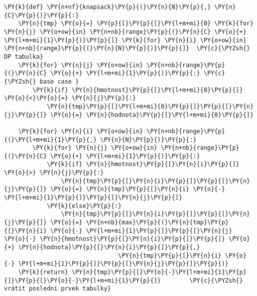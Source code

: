 \begin{Verbatim}[commandchars=\\\{\}]
\PY{k}{def} \PY{n+nf}{knapsack}\PY{p}{(}\PY{n}{N}\PY{p}{,} \PY{n}{C}\PY{p}{)}\PY{p}{:}
	\PY{n}{tmp} \PY{o}{=} \PY{p}{[}\PY{p}{[}\PY{l+m+mi}{0} \PY{k}{for} \PY{n}{j} \PY{o+ow}{in} \PY{n+nb}{range}\PY{p}{(}\PY{n}{C} \PY{o}{+} \PY{l+m+mi}{1}\PY{p}{)}\PY{p}{]} \PY{k}{for} \PY{n}{i} \PY{o+ow}{in} \PY{n+nb}{range}\PY{p}{(}\PY{n}{N}\PY{p}{)}\PY{p}{]}  \PY{c}{\PYZsh{} DP tabulka}
	\PY{k}{for} \PY{n}{j} \PY{o+ow}{in} \PY{n+nb}{range}\PY{p}{(}\PY{n}{C} \PY{o}{+} \PY{l+m+mi}{1}\PY{p}{)}\PY{p}{:} \PY{c}{\PYZsh{} base case }
		\PY{k}{if} \PY{n}{hmotnost}\PY{p}{[}\PY{l+m+mi}{0}\PY{p}{]} \PY{o}{<}\PY{o}{=} \PY{n}{j}\PY{p}{:}
			\PY{n}{tmp}\PY{p}{[}\PY{l+m+mi}{0}\PY{p}{]}\PY{p}{[}\PY{n}{j}\PY{p}{]} \PY{o}{=} \PY{n}{hodnota}\PY{p}{[}\PY{l+m+mi}{0}\PY{p}{]}

	\PY{k}{for} \PY{n}{i} \PY{o+ow}{in} \PY{n+nb}{range}\PY{p}{(}\PY{l+m+mi}{1}\PY{p}{,} \PY{n}{N}\PY{p}{)}\PY{p}{:}
		\PY{k}{for} \PY{n}{j} \PY{o+ow}{in} \PY{n+nb}{range}\PY{p}{(}\PY{n}{C} \PY{o}{+} \PY{l+m+mi}{1}\PY{p}{)}\PY{p}{:}
			\PY{k}{if} \PY{n}{hmotnost}\PY{p}{[}\PY{n}{i}\PY{p}{]} \PY{o}{>} \PY{n}{j}\PY{p}{:}
				\PY{n}{tmp}\PY{p}{[}\PY{n}{i}\PY{p}{]}\PY{p}{[}\PY{n}{j}\PY{p}{]} \PY{o}{=} \PY{n}{tmp}\PY{p}{[}\PY{n}{i} \PY{o}{-} \PY{l+m+mi}{1}\PY{p}{]}\PY{p}{[}\PY{n}{j}\PY{p}{]}
			\PY{k}{else}\PY{p}{:}
				\PY{n}{tmp}\PY{p}{[}\PY{n}{i}\PY{p}{]}\PY{p}{[}\PY{n}{j}\PY{p}{]} \PY{o}{=} \PY{n+nb}{max}\PY{p}{(}\PY{n}{tmp}\PY{p}{[}\PY{n}{i} \PY{o}{-} \PY{l+m+mi}{1}\PY{p}{]}\PY{p}{[}\PY{n}{j} \PY{o}{-} \PY{n}{hmotnost}\PY{p}{[}\PY{n}{i}\PY{p}{]}\PY{p}{]} \PY{o}{+} \PY{n}{hodnota}\PY{p}{[}\PY{n}{i}\PY{p}{]}\PY{p}{,}
								\PY{n}{tmp}\PY{p}{[}\PY{n}{i} \PY{o}{-} \PY{l+m+mi}{1}\PY{p}{]}\PY{p}{[}\PY{n}{j}\PY{p}{]}\PY{p}{)}
	\PY{k}{return} \PY{n}{tmp}\PY{p}{[}\PY{o}{-}\PY{l+m+mi}{1}\PY{p}{]}\PY{p}{[}\PY{o}{-}\PY{l+m+mi}{1}\PY{p}{]}        \PY{c}{\PYZsh{} vrátit poslední prvek tabulky}
\end{Verbatim}
